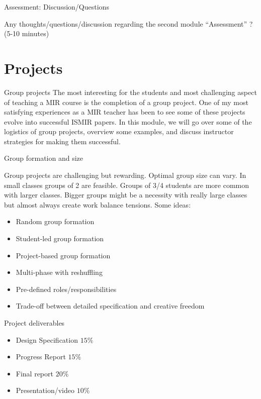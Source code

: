 \documentclass[12pt]{beamer}
\begin{document}
\begin{frame}{Assessment: Discussion/Questions}

  Any thoughts/questions/discussion regarding the second module ``Assessment'' ? (5-10 minutes) 
  
\end{frame}




\section{Projects}

\begin{frame}{Group projects}
  The most interesting for the students and most challenging aspect
  of teaching a MIR course is the completion of a group project. One of my
  most satisfying experiences as a MIR teacher has been to see some of these
  projects evolve into successful ISMIR papers. In this module, we will
  go over some of the logistics of group projects, overview some examples,
  and discuss instructor strategies for making them successful. 
  
\end{frame}


\begin{frame}{Group formation and size}

  Group projects are challenging but rewarding. Optimal group size can vary.
  In small classes groups of 2 are feasible. Groups of 3/4 students are more
  common with larger classes. Bigger groups might be a necessity with really
  large classes but almost always create work balance tensions. Some ideas:

  \begin{itemize}
  \item{Random group formation}
  \item{Student-led group formation}
  \item{Project-based group formation}
  \item{Multi-phase with reshuffling}
  \item{Pre-defined roles/responsibilities}
  \item{Trade-off between detailed specification and creative freedom}
  \end{itemize} 
  
\end{frame}

\begin{frame}{Project deliverables}
  \begin{itemize}
  \item{Design Specification $15\%$}
  \item{Progress Report $15\%$}
  \item{Final report $20\%$}
  \item{Presentation/video $10\%$}

    \end{itemize} 

  \end{frame} 
\end{document}
